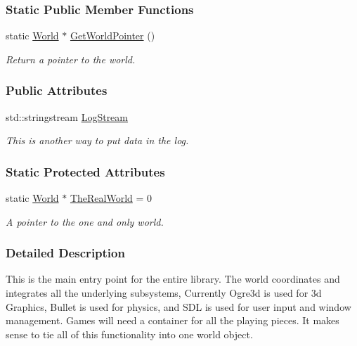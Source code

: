 \subsubsection*{Static Public Member Functions}
\begin{DoxyCompactItemize}
\item 
static \hyperlink{classMezzanine_1_1World}{World} $\ast$ \hyperlink{classMezzanine_1_1World_a8d714f7655aa563cd66cee8db59f9116}{GetWorldPointer} ()
\begin{DoxyCompactList}\small\item\em Return a pointer to the world. \item\end{DoxyCompactList}\end{DoxyCompactItemize}
\subsubsection*{Public Attributes}
\begin{DoxyCompactItemize}
\item 
std::stringstream \hyperlink{classMezzanine_1_1World_a32b1c4de1bbf5495452e463802ffa499}{LogStream}
\begin{DoxyCompactList}\small\item\em This is another way to put data in the log. \item\end{DoxyCompactList}\end{DoxyCompactItemize}
\subsubsection*{Static Protected Attributes}
\begin{DoxyCompactItemize}
\item 
\hypertarget{classMezzanine_1_1World_a86c5d362a144d6cad245fd022f512b21}{
static \hyperlink{classMezzanine_1_1World}{World} $\ast$ \hyperlink{classMezzanine_1_1World_a86c5d362a144d6cad245fd022f512b21}{TheRealWorld} = 0}
\label{classMezzanine_1_1World_a86c5d362a144d6cad245fd022f512b21}

\begin{DoxyCompactList}\small\item\em A pointer to the one and only world. \item\end{DoxyCompactList}\end{DoxyCompactItemize}


\subsubsection{Detailed Description}
This is the main entry point for the entire library. The world coordinates and integrates all the underlying subsystems, Currently Ogre3d is used for 3d Graphics, Bullet is used for physics, and SDL is used for user input and window management. Games will need a container for all the playing pieces. It makes sense to tie all of this functionality into one world object. 

